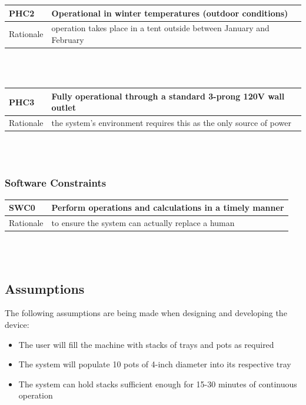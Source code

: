 \documentclass[12pt]{article}
\begin{document}
 \noindent
 \begin{tabular}{ |p{2cm}|p{14cm}| }
  \hline
  PHC2 & Operational in winter temperatures (outdoor conditions)  \\
  \hline
  Rationale & operation takes place in a 
  tent outside between January and February  \\ 

  \hline  
 \end{tabular}\\\\

 \noindent
 \begin{tabular}{ |p{2cm}|p{14cm}| }
  \hline
  PHC3 & Fully operational through a standard 3-prong 120V wall outlet   \\
  \hline
  Rationale & the system’s environment requires this 
  as the only source of power  \\ 

  \hline  
 \end{tabular}\\\\
 
  
\subsubsection{Software Constraints}
\begin{tabular}{ |p{2cm}|p{14cm}| }
  \hline
  SWC0 & Perform operations and calculations in a timely manner \\
  \hline
  Rationale &  to ensure the system can actually replace a human  \\ 

  \hline  
 \end{tabular}\\\\

 \subsection{Assumptions}
 The following assumptions are being made when designing and developing 
  the device:
 \begin{itemize}
  
  \item The user will fill the machine with stacks of trays and 
  pots as required

  \item The system will populate 10 pots of 4-inch diameter into its 
  respective tray
  \item The system can hold stacks sufficient enough for 15-30 minutes of continuous operation
  
 \end{itemize}
\end{document}

